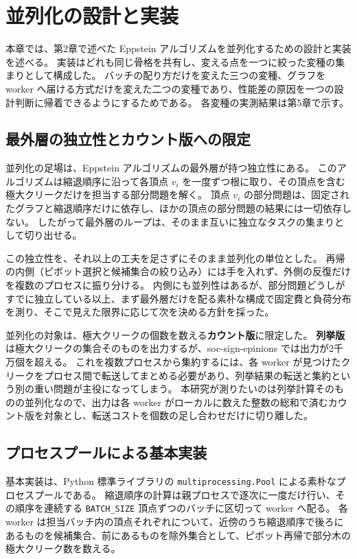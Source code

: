 \chapter{並列化の設計と実装}
\label{ch:implementation}

本章では、第2章で述べた Eppstein アルゴリズムを並列化するための設計と実装を述べる。
実装はどれも同じ骨格を共有し、変える点を一つに絞った変種の集まりとして構成した。
バッチの配り方だけを変えた三つの変種、グラフを worker へ届ける方式だけを変えた二つの変種であり、性能差の原因を一つの設計判断に帰着できるようにするためである。
各変種の実測結果は第5章で示す。

\section{最外層の独立性とカウント版への限定}

並列化の足場は、Eppstein アルゴリズムの最外層が持つ独立性にある。
このアルゴリズムは縮退順序に沿って各頂点 $v_i$ を一度ずつ根に取り、その頂点を含む極大クリークだけを担当する部分問題を解く。
頂点 $v_i$ の部分問題は、固定されたグラフと縮退順序だけに依存し、ほかの頂点の部分問題の結果には一切依存しない。
したがって最外層のループは、そのまま互いに独立なタスクの集まりとして切り出せる。

この独立性を、それ以上の工夫を足さずにそのまま並列化の単位とした。
再帰の内側（ピボット選択と候補集合の絞り込み）には手を入れず、外側の反復だけを複数のプロセスに振り分ける。
内側にも並列性はあるが、部分問題どうしがすでに独立している以上、まず最外層だけを配る素朴な構成で固定費と負荷分布を測り、そこで見えた限界に応じて次を決める方針を採った。

並列化の対象は、極大クリークの個数を数える\textbf{カウント版}に限定した。
\textbf{列挙版}は極大クリークの集合そのものを出力するが、soc-sign-epinions では出力が2千万個を超える。
これを複数プロセスから集約するには、各 worker が見つけたクリークをプロセス間で転送してまとめる必要があり、列挙結果の転送と集約という別の重い問題が主役になってしまう。
本研究が測りたいのは列挙計算そのものの並列化なので、出力は各 worker がローカルに数えた整数の総和で済むカウント版を対象とし、転送コストを個数の足し合わせだけに切り離した。

\section{プロセスプールによる基本実装}

基本実装は、Python 標準ライブラリの \verb|multiprocessing.Pool| による素朴なプロセスプールである。
縮退順序の計算は親プロセスで逐次に一度だけ行い、その順序を連続する \verb|BATCH_SIZE| 頂点ずつのバッチに区切って worker へ配る。
各 worker は担当バッチ内の頂点それぞれについて、近傍のうち縮退順序で後ろにあるものを候補集合、前にあるものを除外集合として、ピボット再帰で部分木の極大クリーク数を数える。

